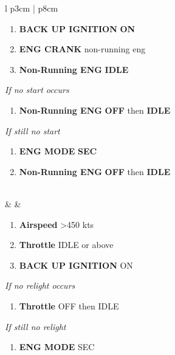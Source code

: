 \documentclass[fontHelvetica, widesubsec]{TechCheck}
\begin{document}
\begin{center}
\begin{longtable}{l p{3cm} | p{8cm}}
\begin{minipage}[t]{\linewidth}
\begin{enumerate}
					\item \textbf{BACK UP IGNITION} \dotfill \textbf{ON}
					\item \textbf{ENG CRANK} \dotfill non-running eng
					\item \textbf{Non-Running ENG} \dotfill \textbf{IDLE}
				\end{enumerate}
				\vspace{-7pt}
				\emph{If no start occurs}
				\begin{enumerate}[label=(\alph*), resume]
					\vspace{-7pt}
					\item \textbf{Non-Running ENG} \dotfill \textbf{OFF} then \textbf{IDLE}
				\end{enumerate}
				\vspace{-7pt}
				\emph{If still no start}
				\begin{enumerate}[label=(\alph*), resume]
					\vspace{-7pt}
					\item \textbf{ENG MODE} \dotfill \textbf{SEC}
					\item \textbf{Non-Running ENG} \dotfill \textbf{OFF} then \textbf{IDLE}
				\end{enumerate}
			\end{minipage} \\
			\midrule
			\textbf{\textbf{\textbullet}} &  &
			\begin{minipage}[t]{\linewidth}
				\vspace{-7pt}
				\begin{enumerate}
					\item \textbf{Airspeed} \dotfill >450 kts
					\item \textbf{Throttle} \dotfill IDLE or above
					\item \textbf{BACK UP IGNITION} \dotfill ON
				\end{enumerate}
				\vspace{-7pt}
				\emph{If no relight occurs}
				\begin{enumerate}[label=(\alph*), resume]
					\vspace{-7pt}
					\item \textbf{Throttle} \dotfill OFF then IDLE
				\end{enumerate}
				\vspace{-7pt}
				\emph{If still no relight}
				\begin{enumerate}[label=(\alph*), resume]
					\vspace{-7pt}
					\item \textbf{ENG MODE} \dotfill SEC

\end{enumerate}
\end{minipage}
\end{longtable}
\end{center}
\end{document}
